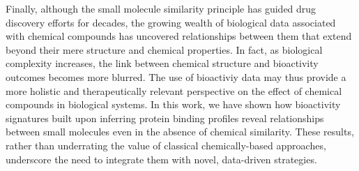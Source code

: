 Finally, although the small molecule similarity principle has guided drug discovery efforts for decades, the growing wealth of biological data associated with chemical compounds has uncovered relationships between them that extend beyond their mere structure and chemical properties. In fact, as biological complexity increases, the link between chemical structure and bioactivity outcomes becomes more blurred. The use of bioactiviy data may thus provide a more holistic and therapeutically relevant perspective on the effect of chemical compounds in biological systems. In this work, we have shown how bioactivity signatures built upon inferring protein binding profiles reveal relationships between small molecules even in the absence of chemical similarity. These results, rather than underrating the value of classical chemically-based approaches, underscore the need to integrate them with novel, data-driven strategies. 





